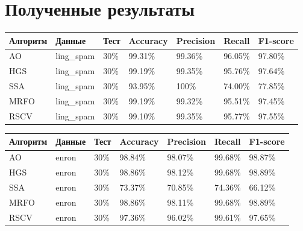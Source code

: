 \section{Полученные результаты}


\begin{table}[!ht]
    \centering
    \begin{tabular}{|p{}|p{}|p{}|p{}|p{}|p{}|p{}|}
        \hline
        Алгоритм & Данные     & Тест & Accuracy & Precision & Recall  & F1-score \\ \hline
        AO       & ling\_spam & 30\% & 99.31\%  & 99.36\%   & 96.05\% & 97.80\%  \\ \hline
        HGS      & ling\_spam & 30\% & 99.19\%  & 99.35\%   & 95.76\% & 97.64\%  \\ \hline
        SSA      & ling\_spam & 30\% & 93.95\%  & 100\%     & 74.00\% & 77.85\%  \\ \hline
        MRFO     & ling\_spam & 30\% & 99.19\%  & 99.32\%   & 95.51\% & 97.45\%  \\ \hline
        RSCV     & ling\_spam & 30\% & 99.10\%  & 99.35\%   & 95.77\% & 97.55\%  \\ \hline
    \end{tabular}
\end{table}

\begin{table}[!ht]
    \centering
    \begin{tabular}{|p{}|p{}|p{}|p{}|p{}|p{}|p{}|}
        \hline
        Алгоритм & Данные & Тест & Accuracy & Precision & Recall  & F1-score \\ \hline
        AO       & enron  & 30\% & 98.84\%  & 98.07\%   & 99.68\% & 98.87\%  \\ \hline
        HGS      & enron  & 30\% & 98.86\%  & 98.12\%   & 99.68\% & 98.89\%  \\ \hline
        SSA      & enron  & 30\% & 73.37\%  & 70.85\%   & 74.36\% & 66.12\%  \\ \hline
        MRFO     & enron  & 30\% & 98.86\%  & 98.11\%   & 99.68\% & 98.89\%  \\ \hline
        RSCV     & enron  & 30\% & 97.36\%  & 96.02\%   & 99.61\% & 97.65\%  \\ \hline
    \end{tabular}
\end{table}

